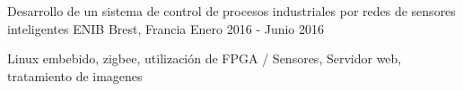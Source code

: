 

\begin{cventries}


\cventry
{Desarrollo de un sistema de control de procesos industriales por redes de sensores inteligentes}
{ENIB} %
{Brest, Francia} %
{Enero 2016 - Junio 2016 } %
{
	\begin{cvitems} %
		\item{Linux embebido, zigbee, utilización de FPGA / Sensores, Servidor web,
		tratamiento de imagenes}
	\end{cvitems}
}



\end{cventries}
